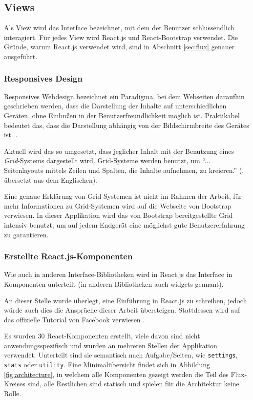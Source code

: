 \documentclass[12pt,twoside]{book}
\begin{document}
\subsection{Views}

Als View wird das Interface bezeichnet, mit dem der Benutzer schlussendlich interagiert. Für jedes View wird React.js und React-Bootstrap verwendet. Die Gründe, warum React.js verwendet wird, sind in Abschnitt \ref{sec:flux} genauer ausgeführt.

\subsubsection*{Responsives Design}

Responsives Webdesign bezeichnet ein Paradigma, bei dem Webseiten daraufhin geschrieben werden, dass die Darstellung der Inhalte auf unterschiedlichen Geräten, ohne Einbußen in der Benutzerfreundlichkeit möglich ist. Praktikabel bedeutet das, dass die Darstellung abhängig von der Bildschirmbreite des Gerätes ist. \cite{natda2013responsive}.

Aktuell wird das so umgesetzt, dass jeglicher Inhalt mit der Benutzung eines \textit{Grid}-Systems dargestellt wird. Grid-Systeme werden benutzt, um ``... Seitenlayouts mittels Zeilen und Spalten, die Inhalte aufnehmen, zu kreieren.'' (\cite{bootstrap}, übersetzt aus dem Englischen).

Eine genaue Erklärung von Grid-Systemen ist nicht im Rahmen der Arbeit, für mehr Informationen zu Grid-Systemen wird auf die Webseite von Bootstrap \cite{bootstrap} verwiesen.
In dieser Applikation wird das von Bootstrap bereitgestellte Grid intensiv benutzt, um auf jedem Endgerät eine möglichst gute Benutzererfahrung zu garantieren.

\subsubsection*{Erstellte React.js-Komponenten}

Wie auch in anderen Interface-Bibliotheken wird in React.js das Interface in Komponenten unterteilt (in anderen Bibliotheken auch widgets gennant).

An dieser Stelle wurde überlegt, eine Einführung in React.js zu schreiben, jedoch würde auch dies die Ansprüche dieser Arbeit übersteigen. Stattdessen wird auf das offizielle Tutorial von Facebook verwiesen \cite{tutorial}.

Es wurden 30 React-Komponenten erstellt, viele davon sind nicht anwendungsspezifisch und wurden an mehreren Stellen der Applikation verwendet. Unterteilt sind sie semantisch nach Aufgabe/Seiten, wie  \texttt{settings}, \texttt{stats} oder \texttt{utility}.
Eine Minimalübersicht findet sich in Abbildung \ref{fig:architecture}, in welchem alle Komponenten gezeigt werden die Teil des Flux-Kreises sind, alle Restlichen sind statisch und spielen für die Architektur keine Rolle.
\end{document}
